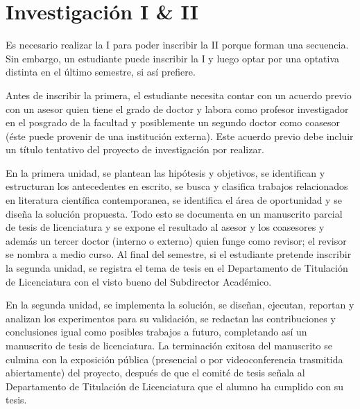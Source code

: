 \documentclass{article}
\begin{document}
\hypertarget{inv}{\section*{Investigaci\'{o}n I \& II}}

Es necesario realizar la I para poder inscribir la II porque forman
una secuencia. Sin embargo, un estudiante puede inscribir la I y luego
optar por una optativa distinta en el \'{u}ltimo semestre, si as\'{i}
prefiere.

Antes de inscribir la primera, el estudiante necesita contar con un
acuerdo previo con un asesor quien tiene el grado de doctor y labora
como profesor investigador en el posgrado de la facultad y
posiblemente un segundo doctor como coasesor (\'{e}ste puede provenir de
una instituci\'{o}n externa). Este acuerdo previo debe incluir un t\'{i}tulo
tentativo del proyecto de investigaci\'{o}n por realizar.

En la primera unidad, se plantean las hip\'{o}tesis y objetivos, se
identifican y estructuran los antecedentes en escrito, se busca y
clasifica trabajos relacionados en literatura cient\'{i}fica
contemporanea, se identifica el \'{a}rea de oportunidad y se dise\~{n}a la
soluci\'{o}n propuesta. Todo esto se documenta en un manuscrito parcial de
tesis de licenciatura y se expone el resultado al asesor y los
coasesores y adem\'{a}s un tercer doctor (interno o externo) quien funge
como revisor; el revisor se nombra a medio curso. Al final del
semestre, si el estudiante pretende inscribir la segunda unidad, se
registra el tema de tesis en el Departamento de Titulaci\'{o}n de Licenciatura con el
visto bueno del Subdirector Acad\'{e}mico.

En la segunda unidad, se implementa la soluci\'{o}n, se dise\~{n}an, ejecutan,
reportan y analizan los experimentos para su validaci\'{o}n, se redactan
las contribuciones y conclusiones igual como posibles trabajos a
futuro, completando as\'{i} un manuscrito de tesis de licenciatura. La
terminaci\'{o}n exitosa del manuscrito se culmina con la exposici\'{o}n
p\'{u}blica (presencial o por videoconferencia trasmitida abiertamente)
del proyecto, despu\'{e}s de que el comit\'{e} de tesis se\~{n}ala al Departamento
de Titulaci\'{o}n de Licenciatura que el alumno ha cumplido con su tesis.
\end{document}
